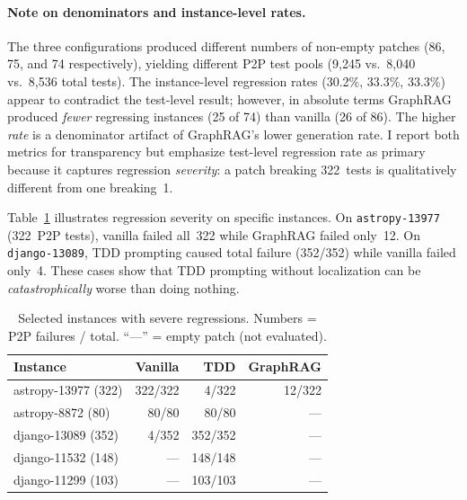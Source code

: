 \documentclass[sigconf,nonacm]{acmart}
\begin{document}
\paragraph{Note on denominators and instance-level rates.}
The three configurations produced different numbers of non-empty patches
(86, 75, and 74 respectively), yielding different P2P test pools
(9{,}245 vs.\ 8{,}040 vs.\ 8{,}536 total tests).  The instance-level
regression rates (30.2\%, 33.3\%, 33.3\%) appear to contradict the
test-level result; however, in absolute terms GraphRAG produced
\emph{fewer} regressing instances (25 of 74) than vanilla (26 of 86).
The higher \emph{rate} is a denominator artifact of GraphRAG's lower
generation rate.  I report both metrics for transparency but emphasize
test-level regression rate as primary because it captures regression
\emph{severity}: a patch breaking 322~tests is qualitatively different
from one breaking~1.

Table~\ref{tab:catastrophic} illustrates regression severity on
specific instances.  On \texttt{astropy\hbox{-}13977} (322~P2P tests),
vanilla failed all~322 while GraphRAG failed only~12.  On
\texttt{django\hbox{-}13089}, TDD prompting caused total failure
(352/352) while vanilla failed only~4.  These cases show that TDD
prompting without localization can be \emph{catastrophically} worse
than doing nothing.

\begin{table}[t]
\caption{Selected instances with severe regressions.  Numbers = P2P failures /
  total.  ``---'' = empty patch (not evaluated).}
\label{tab:catastrophic}
\small
\begin{tabular}{@{}lrrr@{}}
\toprule
\textbf{Instance} & \textbf{Vanilla} & \textbf{TDD} & \textbf{GraphRAG} \\
\midrule
astropy-13977 (322)   & 322/322 & 4/322   & 12/322 \\
astropy-8872 (80)     & 80/80   & 80/80   & --- \\
django-13089 (352)    & 4/352   & 352/352 & --- \\
django-11532 (148)    & ---     & 148/148 & --- \\
django-11299 (103)    & ---     & 103/103 & --- \\
\bottomrule
\end{tabular}
\end{table}
\end{document}
